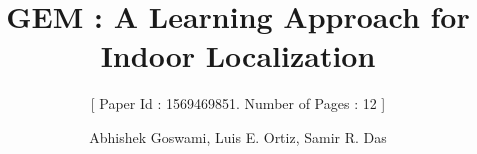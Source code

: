 \documentclass{sig-alternate-10pt}
\begin{document}
%

\title{GEM : A Learning Approach for Indoor Localization}
\subtitle{[  Paper Id : 1569469851. Number of Pages : 12 ]}
%
%
%
%
%

%
\author{
%
%
\alignauthor
Abhishek Goswami, Luis E. Ortiz, Samir R. Das\\
       \\
       \\
}
\end{document}
